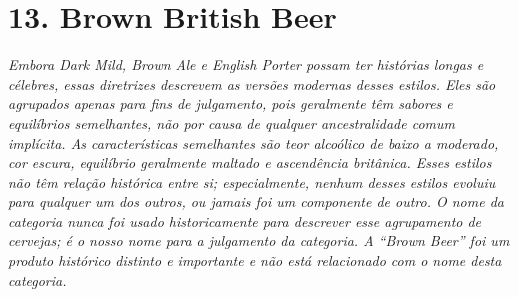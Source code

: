 \section*{13. Brown British Beer}
\textit{Embora Dark Mild, Brown Ale e English Porter possam ter histórias longas e célebres, essas diretrizes descrevem as versões modernas desses estilos. Eles são agrupados apenas para fins de julgamento, pois geralmente têm sabores e equilíbrios semelhantes, não por causa de qualquer ancestralidade comum implícita. As características semelhantes são teor alcoólico de baixo a moderado, cor escura, equilíbrio geralmente maltado e ascendência britânica. Esses estilos não têm relação histórica entre si; especialmente, nenhum desses estilos evoluiu para qualquer um dos outros, ou jamais foi um componente de outro. O nome da categoria nunca foi usado historicamente para descrever esse agrupamento de cervejas; é o nosso nome para a julgamento da categoria. A “Brown Beer” foi um produto histórico distinto e importante e não está relacionado com o nome desta categoria.}
